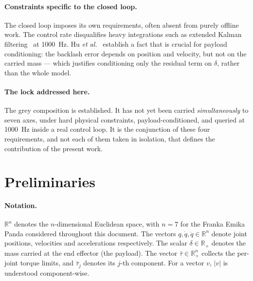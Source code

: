 \documentclass[a4paper, oneside]{article}
\newcommand{\q}{\ensuremath{q}}
\newcommand{\qd}{\ensuremath{\dot{q}}}
\newcommand{\qdd}{\ensuremath{\ddot{q}}}
\newcommand{\Rset}{\ensuremath{\mathbb{R}}}
\begin{document}
\paragraph{Constraints specific to the closed loop.}
The closed loop imposes its own requirements, often absent from purely offline
work. The control rate disqualifies heavy integrations such as extended Kalman
filtering~\cite{wang2024cac} at \SI{1000}{\hertz}. Hu \emph{et
al.}~\cite{hu2026} establish a fact that is crucial for payload conditioning:
the backlash error depends on position and velocity, but not on the carried
mass --- which justifies conditioning only the residual term on $\delta$,
rather than the whole model.

\paragraph{The lock addressed here.}
The grey composition is established. It has not yet been carried
\emph{simultaneously} to seven axes, under hard physical constraints,
payload-conditioned, and queried at \SI{1000}{\hertz} inside a real control
loop. It is the conjunction of these four requirements, and not each of them
taken in isolation, that defines the contribution of the present work.

\section{Preliminaries}
\label{sec-prelim}

\paragraph{Notation.}
$\Rset^{n}$ denotes the $n$-dimensional Euclidean space, with $n = 7$ for the
Franka Emika Panda considered throughout this document. The vectors
$\q, \qd, \qdd \in \Rset^{n}$ denote joint positions, velocities and
accelerations respectively. The scalar $\delta \in \Rset_{+}$ denotes the mass
carried at the end effector (the payload). The vector
$\bar{\tau} \in \Rset^{n}_{+}$ collects the per-joint torque limits, and
$\bar{\tau}_{j}$ denotes its $j$-th component. For a vector $v$, $|v|$ is
understood component-wise.
\end{document}
